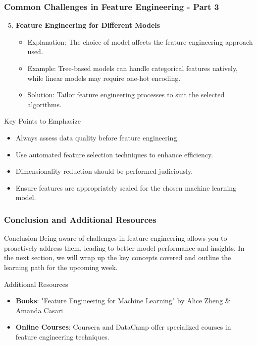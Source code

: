 \documentclass[aspectratio=169]{beamer}
\begin{document}
\begin{frame}
    \frametitle{Common Challenges in Feature Engineering - Part 3}
    \begin{enumerate}
        \setcounter{enumi}{4}
        \item \textbf{Feature Engineering for Different Models}
            \begin{itemize}
                \item Explanation: The choice of model affects the feature engineering approach used.
                \item Example: Tree-based models can handle categorical features natively, while linear models may require one-hot encoding.
                \item Solution: Tailor feature engineering processes to suit the selected algorithms.
            \end{itemize}
    \end{enumerate}
    
    \begin{block}{Key Points to Emphasize}
        \begin{itemize}
            \item Always assess data quality before feature engineering.
            \item Use automated feature selection techniques to enhance efficiency.
            \item Dimensionality reduction should be performed judiciously.
            \item Ensure features are appropriately scaled for the chosen machine learning model.
        \end{itemize}
    \end{block}
\end{frame}

\begin{frame}
    \frametitle{Conclusion and Additional Resources}
    \begin{block}{Conclusion}
        Being aware of challenges in feature engineering allows you to proactively address them, leading to better model performance and insights. In the next section, we will wrap up the key concepts covered and outline the learning path for the upcoming week.
    \end{block}
    
    \begin{block}{Additional Resources}
        \begin{itemize}
            \item \textbf{Books}: "Feature Engineering for Machine Learning" by Alice Zheng \& Amanda Casari
            \item \textbf{Online Courses}: Coursera and DataCamp offer specialized courses in feature engineering techniques.
        \end{itemize}
    \end{block}
\end{frame}
\end{document}
